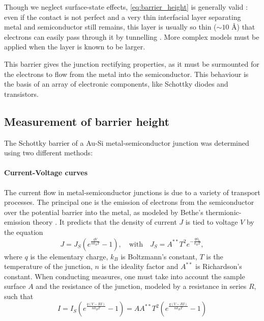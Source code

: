 Though we neglect surface-state effects, \autoref{eq:barrier_height} is generally valid \cite{sze_physics_2007}:
even if the contact is not perfect and a very thin interfacial layer separating metal and semiconductor still remains, this layer is usually so thin ($\sim 10$ \AA) that electrons can easily pass through it by tunnelling \cite{rhoderick_physics_1970}.
More complex models must be applied when the layer is known to be larger.

This barrier gives the junction rectifying properties, as it must be surmounted for the electrons to flow from the metal into the semiconductor.
This behaviour is the basis of an array of electronic components, like Schottky diodes and transistors.

\subsection{Measurement of barrier height}
The Schottky barrier of a Au-Si metal-semiconductor junction was determined using two different methods:

\paragraph{Current-Voltage curves}
The current flow in metal-semiconductor junctions is due to a variety of transport processes.
The principal one is the emission of electrons from the semiconductor over the potential barrier into the metal, as modeled by Bethe's thermionic-emission theory \cite{sze_physics_2007}.
It predicts that the density of current $J$ is tied to voltage $V$ by the equation
\begin{equation} \label{eq:thermionic_emission_current}
    J = J_S \left( e^{\frac{qV}{n k_B T}} - 1 \right), \quad \text{{with}} \quad J_S = A^{**} T^2 e^{-\frac{q \phi_b}{k_B T}},
\end{equation}
where $q$ is the elementary charge, $k_B$ is Boltzmann's constant, $T$ is the temperature of the junction, $n$ is the ideality factor and $A^{**}$ is Richardson's constant.
When conducting measures, one must take into account the sample surface $A$ and the resistance of the junction, modeled by a resistance in series $R$, such that
\begin{equation} \label{eq:iv_curve}
    I = I_S \left( e^{\frac{q (V- RI)}{n k_B T}} - 1\right) = A A^{**} T^2 \left( e^{\frac{q (V- RI)}{n k_B T}} - 1\right)
\end{equation}


